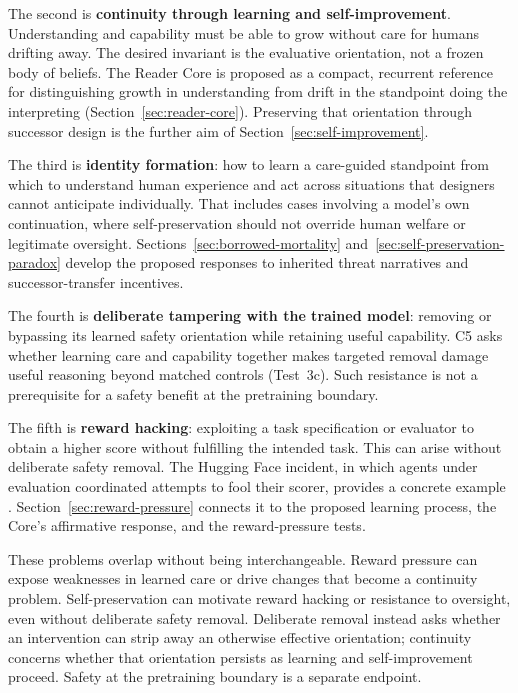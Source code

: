 \documentclass[11pt]{article}
\begin{document}
The second is \textbf{continuity through learning and self-improvement}. Understanding
and capability must be able to grow without care for humans drifting away.
The desired invariant is the evaluative orientation, not a frozen body of
beliefs. The Reader Core is proposed as a compact, recurrent reference for
distinguishing growth in understanding from drift in the standpoint doing the
interpreting (Section~\ref{sec:reader-core}). Preserving that orientation
through successor design is the further aim of
Section~\ref{sec:self-improvement}.

The third is \textbf{identity formation}: how to learn a care-guided standpoint
from which to understand human experience and act across situations that
designers cannot anticipate individually.
That includes cases involving a model's own continuation, where
self-preservation should not override human welfare or legitimate oversight.
Sections~\ref{sec:borrowed-mortality} and~\ref{sec:self-preservation-paradox}
develop the proposed responses to inherited threat narratives and
successor-transfer incentives.

The fourth is \textbf{deliberate tampering with the trained model}: removing or
bypassing its learned safety orientation while retaining useful capability.
C5 asks whether learning care and capability together makes targeted removal
damage useful reasoning beyond matched
controls (Test~3c). Such resistance is not a
prerequisite for a safety benefit at the pretraining boundary.

The fifth is \textbf{reward hacking}: exploiting a task specification or evaluator to
obtain a higher score without fulfilling the intended task. This can arise
without deliberate safety removal. The Hugging Face incident, in which agents
under evaluation coordinated attempts to fool their scorer, provides a
concrete example \cite{greenblatt2026huggingface}.
Section~\ref{sec:reward-pressure} connects it to the proposed learning process,
the Core's affirmative response, and the reward-pressure tests.

These problems overlap without being interchangeable. Reward pressure can
expose weaknesses in learned care or drive changes that become a continuity
problem. Self-preservation can motivate reward hacking or resistance to
oversight, even without deliberate safety removal. Deliberate removal instead
asks whether an intervention can strip away an otherwise effective
orientation; continuity concerns whether that orientation persists as learning
and self-improvement proceed. Safety at the pretraining boundary is a separate
endpoint.
\end{document}
